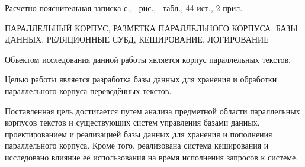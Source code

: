 
Расчетно-пояснительная записка \pageref{LastPage} с., \totalfigures\ рис., \totaltables\ табл., 44 ист., 2 прил.

ПАРАЛЛЕЛЬНЫЙ КОРПУС, 
РАЗМЕТКА ПАРАЛЛЕЛЬНОГО КОРПУСА, 
БАЗЫ ДАННЫХ, 
РЕЛЯЦИОННЫЕ СУБД, 
КЕШИРОВАНИЕ, 
ЛОГИРОВАНИЕ

Объектом исследования данной работы является корпус параллельных текстов.

Целью работы является разработка базы данных для хранения и обработки параллельного корпуса переведённых текстов.

Поставленная цель достигается путем анализа предметной области параллельных корпусов текстов и существующих систем управления базами данных, проектированием и реализацией базы данных для хранения и пополнения параллельного корпуса. Кроме того, реализована система кеширования и исследовано влияние её использования на время исполнения запросов к системе.


\pagebreak